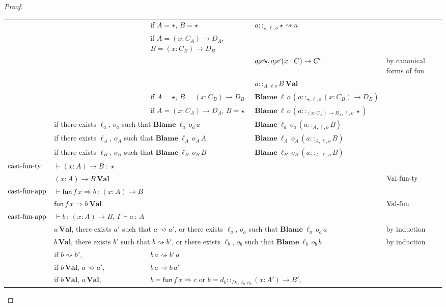 \begin{proof}
\begin{tabular}{lllll}
 &  & if $A=\star$, $B=\star$  & $a::_{\star,\ell ,o}\star\rightsquigarrow a$ & \tabularnewline
 &  & if $A=\left(x:C_{A}\right)\rightarrow D_{A}$, $B=\left(x:C_{B}\right)\rightarrow D_{B}$ &  & \tabularnewline
 &  &  & $a\cancel{=}\star,a\cancel{=}\left(x:C\right)\rightarrow C'$ & by canonical forms of fun \tabularnewline
 &  &  & $a::_{A,\ell o}B\:\textbf{Val}$ & \tabularnewline
 &  & if $A=\star$, $B=\left(x:C_{B}\right)\rightarrow D_{B}$  & $\textbf{Blame}\:\ell \,o\,\left(a::_{\star,\ell ,o}\left(x:C_{B}\right)\rightarrow D_{B}\right)$ & \tabularnewline
 &  & if $A=\left(x:C_{A}\right)\rightarrow D_{A}$, $B=\star$ & $\textbf{Blame}\:\ell \,o\,\left(a::_{\left(x:C_{A}\right)\rightarrow B_{A},\ell ,o}\star\right)$ & \tabularnewline
 & \multicolumn{2}{l}{if there exists $\ell_{a}$, $o_{a}$ such that $\textbf{Blame}\:\ell _{a}\,o_{a}\,a$} & $\textbf{Blame}\:\ell _{a}\,o_{a}\,\left(a::_{A,\ell ,o}B\right)$ & \tabularnewline
 & \multicolumn{2}{l}{if there exists $\ell_{A}$, $o_{A}$ such that $\textbf{Blame}\:\ell _{A}\,o_{A}\,A$} & $\textbf{Blame}\:\ell _{A}\,o_{A}\,\left(a::_{A,\ell ,o}B\right)$ & \tabularnewline
 & \multicolumn{2}{l}{if there exists $\ell_{B}$, $o_{B}$ such that $\textbf{Blame}\:\ell _{B}\,o_{B}\,B$} & $\textbf{Blame}\:\ell _{B}\,o_{B}\,\left(a::_{A,\ell ,o}B\right)$ & \tabularnewline
$\operatorname{cast-fun-ty}$ & $\vdash\left(x:A\right)\rightarrow B\,:\,\star$ &  &  & \tabularnewline
 & $\left(x:A\right)\rightarrow B\,\textbf{Val}$ &  &  & $\operatorname{Val-fun-ty}$\tabularnewline
$\operatorname{cast-fun-app}$ & $\vdash\mathsf{fun}\,f\,x\Rightarrow b\,:\,\left(x:A\right)\rightarrow B$ &  &  & \tabularnewline
 & $\mathsf{fun}\,f\,x\Rightarrow b\:\textbf{Val}$ &  &  & $\operatorname{Val-fun}$\tabularnewline
$\operatorname{cast-fun-app}$ & \multicolumn{2}{l}{$\vdash b\,:\,\left(x:A\right)\rightarrow B$, $\Gamma\vdash a\,:\,A$} & \tabularnewline
 & \multicolumn{3}{l}{$a\,\textbf{Val}$, there exists $a'$ such that $a\rightsquigarrow a'$,
or there exists $\ell_{a}$, $o_{a}$ such that $\textbf{Blame}\:\ell _{a}\,o_{a}\,a$} & by induction\tabularnewline
 & \multicolumn{3}{l}{$b\,\textbf{Val}$, there exists $b'$ such that $b\rightsquigarrow b'$,
or there exists $\ell_{b}$, $o_{b}$ such that $\textbf{Blame}\:\ell _{b}\,o_{b}\,b$} & by induction\tabularnewline
 & if $b\rightsquigarrow b'$, & $b\,a\rightsquigarrow b'\,a$ &  & \tabularnewline
 & if $b\,\textbf{Val}$, $a\rightsquigarrow a'$, & $b\,a\rightsquigarrow b\,a'$ &  & \tabularnewline
 & if $b\,\textbf{Val}$, $a\,\textbf{Val}$, & \multicolumn{2}{l}{$b=\mathsf{fun}\,f\,x\Rightarrow c$ or $b=d_{b}::_{D_{b},\ell _{b}\,o_{b}}\left(x:A'\right)\rightarrow B'$,
}
\end{tabular}
\end{proof}
